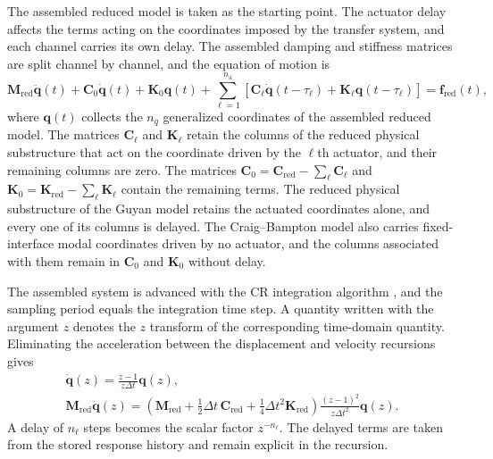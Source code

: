 \documentclass[a4paper,fleqn,review,12pt]{cas-sc}
\numberwithin{equation}{section}
\begin{document}
The assembled reduced model is taken as the starting point. The actuator delay affects the terms acting on the coordinates imposed by the transfer system, and each channel carries its own delay. The assembled damping and stiffness matrices are split channel by channel, and the equation of motion is
\begin{equation}
  \mathbf{M}_{\mathrm{red}}\ddot{\bm{q}}(t)
  +\mathbf{C}_{0}\dot{\bm{q}}(t)
  +\mathbf{K}_{0}\bm{q}(t)
  +\sum_{\ell=1}^{n_{\mathrm{a}}}
  \left[
    \mathbf{C}_{\ell}\dot{\bm{q}}(t-\tau_{\ell})
    +\mathbf{K}_{\ell}\bm{q}(t-\tau_{\ell})
  \right]
  =\bm{f}_{\mathrm{red}}(t),
  \label{eq:delayed-eom}
\end{equation}
where \(\bm{q}(t)\) collects the \(n_{q}\) generalized coordinates of the assembled reduced model. The matrices \(\mathbf{C}_{\ell}\) and \(\mathbf{K}_{\ell}\) retain the columns of the reduced physical substructure that act on the coordinate driven by the \(\ell\)th actuator, and their remaining columns are zero. The matrices \(\mathbf{C}_{0}=\mathbf{C}_{\mathrm{red}}-\sum_{\ell}\mathbf{C}_{\ell}\) and \(\mathbf{K}_{0}=\mathbf{K}_{\mathrm{red}}-\sum_{\ell}\mathbf{K}_{\ell}\) contain the remaining terms. The reduced physical substructure of the Guyan model retains the actuated coordinates alone, and every one of its columns is delayed. The Craig--Bampton model also carries fixed-interface modal coordinates driven by no actuator, and the columns associated with them remain in \(\mathbf{C}_{0}\) and \(\mathbf{K}_{0}\) without delay.

The assembled system is advanced with the CR integration algorithm \cite{ChenRiclesMarullo2009}, and the sampling period equals the integration time step. A quantity written with the argument \(z\) denotes the \(z\) transform of the corresponding time-domain quantity. Eliminating the acceleration between the displacement and velocity recursions gives
\begin{equation}
  \begin{gathered}
    \dot{\bm{q}}(z)
    =\frac{z-1}{z\Delta t}\bm{q}(z),\\[2pt]
    \mathbf{M}_{\mathrm{red}}\ddot{\bm{q}}(z)
    =\left(
      \mathbf{M}_{\mathrm{red}}
      +\tfrac{1}{2}\Delta t\,\mathbf{C}_{\mathrm{red}}
      +\tfrac{1}{4}\Delta t^{2}\mathbf{K}_{\mathrm{red}}
    \right)
    \frac{(z-1)^{2}}{z\Delta t^{2}}\bm{q}(z).
  \end{gathered}
  \label{eq:z-derivatives}
\end{equation}
A delay of \(n_{\ell}\) steps becomes the scalar factor \(z^{-n_{\ell}}\). The delayed terms are taken from the stored response history and remain explicit in the recursion.
\end{document}
